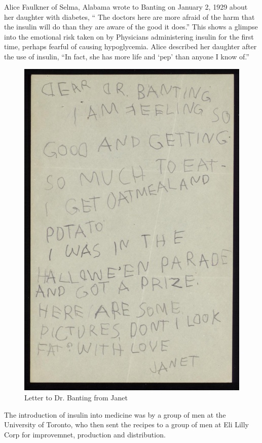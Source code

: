 \documentclass[12pt]{article}
\begin{document}
Alice Faulkner of Selma, Alabama wrote to Banting on January 2, 1929 about her daughter with diabetes, `` The doctors here are more afraid of the harm that the insulin will do than they are aware of the good it does.'' This shows a glimpse into the emotional risk taken on by Physicians administering insulin for the first time, perhaps fearful of causing hypoglycemia. Alice described her daughter after the use of insulin, ``In fact, she has more life and `pep' than anyone I know of.'' 


\begin{figure}[H]
\centering
  \includegraphics [width=5.5in]{banting_fat}
  \caption{Letter to Dr. Banting from Janet}
  \label{fig:Letter from Janet}
\end{figure}

The introduction of insulin into medicine was by a group of men at the University of Toronto, who then sent the recipes to a group of men at Eli Lilly Corp for improvemnet, production and distribution. 
\end{document}
